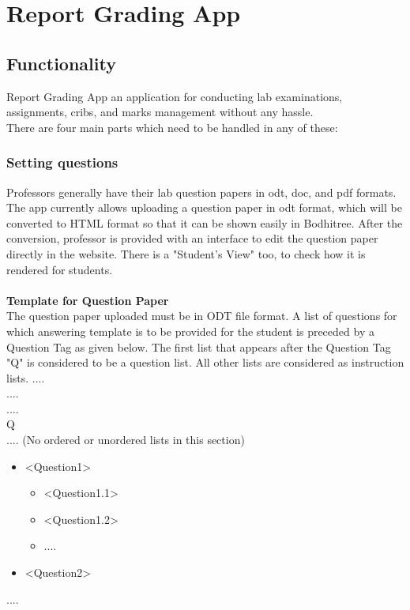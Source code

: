 \section{Report Grading App}
\subsection{Functionality}
Report Grading App an application for conducting lab examinations, assignments, cribs, and marks management without any hassle.\\
There are four main parts which need to be handled in any of these:
\subsubsection{Setting questions}
Professors generally have their lab question papers in odt, doc, and pdf formats. The app currently allows uploading a question paper in odt format, which will be converted to HTML format so that it can be shown easily in Bodhitree. After the conversion, professor is provided with an interface to edit the question paper directly in the website. There is a "Student's View" too, to check how it is rendered for students.\\
\\
\textbf{Template for Question Paper}\\
The question paper uploaded must be in ODT file format. A list of questions for which answering template is to be provided for the student is preceded
by a Question Tag as given below. The first list that appears after the Question Tag "Q" is
considered to be a question list. All other lists are considered as instruction lists.
....\\
....\\
....\\
Q\\
.... (No ordered or unordered lists in this section)\\
\begin{itemize}
	\item \textless Question1\textgreater
	\begin{itemize}
		\item \textless Question1.1\textgreater
		\item \textless Question1.2\textgreater
		\item ....
	\end{itemize}
	\item \textless Question2\textgreater
\end{itemize}
....

